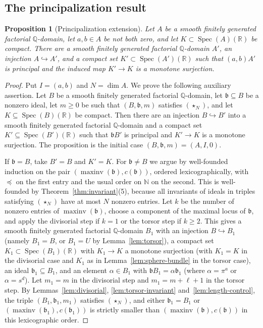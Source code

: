 \documentclass[11pt]{amsart}
\numberwithin{equation}{section}
\newtheorem{proposition}[theorem]{Proposition}
\theoremstyle{definition}
\newcommand{\Q}{\mathbb{Q}}
\newcommand{\R}{\mathbb{R}}
\newcommand{\N}{\mathbb{N}}
\newcommand{\fb}{\mathfrak{b}}
\DeclareMathOperator{\Spec}{Spec}
\DeclareMathOperator{\maxinv}{maxinv}
\begin{document}
\subsection{The principalization result}

\begin{proposition}[Principalization extension]\label{prop:principalization-extension}
Let $A$ be a smooth finitely generated factorial $\Q$-domain, let $a,b\in A$ be not both zero, and let $K\subset\Spec(A)(\R)$ be compact. There are a smooth finitely generated factorial $\Q$-domain $A'$, an injection $A\hookrightarrow A'$, and a compact set $K'\subset\Spec(A')(\R)$ such that $(a,b)A'$ is principal and the induced map $K'\to K$ is a monotone surjection.
\end{proposition}

\begin{proof}
Put $I=(a,b)$ and $N=\dim A$. We prove the following auxiliary assertion. Let $B$ be a smooth finitely generated factorial $\Q$-domain, let $\fb\subseteq B$ be a nonzero ideal, let $m\ge0$ be such that $(B,\fb,m)$ satisfies $(\star_N)$, and let $K\subseteq\Spec(B)(\R)$ be compact. Then there are an injection $B\hookrightarrow B'$ into a smooth finitely generated factorial $\Q$-domain and a compact set $K'\subseteq\Spec(B')(\R)$ such that $\fb B'$ is principal and $K'\to K$ is a monotone surjection. The proposition is the initial case $(B,\fb,m)=(A,I,0)$.

If $\fb=B$, take $B'=B$ and $K'=K$. For $\fb\ne B$ we argue by well-founded induction on the pair $(\maxinv(\fb),c(\fb))$, ordered lexicographically, with $\preceq$ on the first entry and the usual order on $\N$ on the second. This is well-founded by Theorem~\ref{thm:invariant}(5), because all invariants of ideals in triples satisfying $(\star_N)$ have at most $N$ nonzero entries. Let $k$ be the number of nonzero entries of $\maxinv(\fb)$, choose a component of the maximal locus of $\fb$, and apply the divisorial step if $k=1$ or the torsor step if $k\ge2$. This gives a smooth finitely generated factorial $\Q$-domain $B_1$ with an injection $B\hookrightarrow B_1$ (namely $B_1=B$, or $B_1=U$ by Lemma~\ref{lem:torsor}), a compact set $K_1\subset\Spec(B_1)(\R)$ with $K_1\to K$ a monotone surjection (with $K_1=K$ in the divisorial case and $K_1$ as in Lemma~\ref{lem:sphere-bundle} in the torsor case), an ideal $\fb_1\subseteq B_1$, and an element $\alpha\in B_1$ with $\fb B_1=\alpha\fb_1$ (where $\alpha=\pi^a$ or $\alpha=s^d$). Let $m_1=m$ in the divisorial step and $m_1=m+\ell+1$ in the torsor step. By Lemmas~\ref{lem:divisorial}, \ref{lem:torsor-invariant} and~\ref{lem:length-control}, the triple $(B_1,\fb_1,m_1)$ satisfies $(\star_N)$, and either $\fb_1=B_1$ or $(\maxinv(\fb_1),c(\fb_1))$ is strictly smaller than $(\maxinv(\fb),c(\fb))$ in this lexicographic order.


\end{proof}
\end{document}

